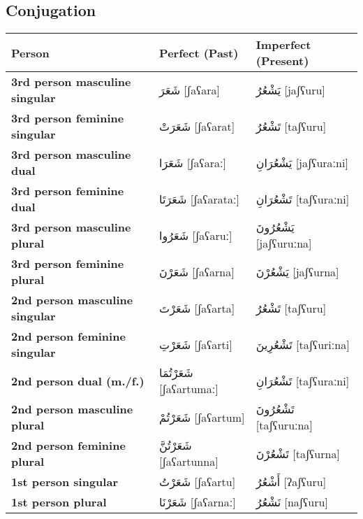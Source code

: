 \documentclass[letterpaper,12pt]{article}
\begin{document}
\subsection{Conjugation}
\begin{longtable}{|>{\raggedright}p{3.5cm}|p{5cm}|p{5cm}|}
\hline
\textbf{Person} & \textbf{Perfect (Past)} & \textbf{Imperfect (Present)} \\
\hline
\textbf{3rd person masculine singular} & \textarabic{شَعَرَ} [ʃaʕara] & \textarabic{يَشْعُرُ} [jaʃʕuru] \\
\hline
\textbf{3rd person feminine singular} & \textarabic{شَعَرَتْ} [ʃaʕarat] & \textarabic{تَشْعُرُ} [taʃʕuru] \\
\hline
\textbf{3rd person masculine dual} & \textarabic{شَعَرَا} [ʃaʕaraː] & \textarabic{يَشْعُرَانِ} [jaʃʕuraːni] \\
\hline
\textbf{3rd person feminine dual} & \textarabic{شَعَرَتَا} [ʃaʕarataː] & \textarabic{تَشْعُرَانِ} [taʃʕuraːni] \\
\hline
\textbf{3rd person masculine plural} & \textarabic{شَعَرُوا} [ʃaʕaruː] & \textarabic{يَشْعُرُونَ} [jaʃʕuruːna] \\
\hline
\textbf{3rd person feminine plural} & \textarabic{شَعَرْنَ} [ʃaʕarna] & \textarabic{يَشْعُرْنَ} [jaʃʕurna] \\
\hline
\textbf{2nd person masculine singular} & \textarabic{شَعَرْتَ} [ʃaʕarta] & \textarabic{تَشْعُرُ} [taʃʕuru] \\
\hline
\textbf{2nd person feminine singular} & \textarabic{شَعَرْتِ} [ʃaʕarti] & \textarabic{تَشْعُرِينَ} [taʃʕuriːna] \\
\hline
\textbf{2nd person dual (m./f.)} & \textarabic{شَعَرْتُمَا} [ʃaʕartumaː] & \textarabic{تَشْعُرَانِ} [taʃʕuraːni] \\
\hline
\textbf{2nd person masculine plural} & \textarabic{شَعَرْتُمْ} [ʃaʕartum] & \textarabic{تَشْعُرُونَ} [taʃʕuruːna] \\
\hline
\textbf{2nd person feminine plural} & \textarabic{شَعَرْتُنَّ} [ʃaʕartunna] & \textarabic{تَشْعُرْنَ} [taʃʕurna] \\
\hline
\textbf{1st person singular} & \textarabic{شَعَرْتُ} [ʃaʕartu] & \textarabic{أَشْعُرُ} [ʔaʃʕuru] \\
\hline
\textbf{1st person plural} & \textarabic{شَعَرْنَا} [ʃaʕarnaː] & \textarabic{نَشْعُرُ} [naʃʕuru] \\
\hline
\end{longtable}
\end{document}
